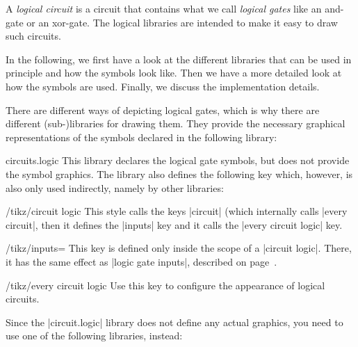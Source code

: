 A \emph{logical circuit} is a circuit that contains what we call
\emph{logical gates} like an and-gate or an xor-gate. The logical
libraries are intended to make it easy to draw such circuits.

In the following, we first have a look at the different libraries that
can be used in principle and how the symbols look like. Then we have a
more detailed look at how the symbols are used. Finally, we discuss
the implementation details.

There are different ways of depicting logical gates, which is why there
are different (sub-)libraries for drawing them. They provide the
necessary graphical representations of the symbols declared in the
following library: 

\begin{tikzlibrary}{circuits.logic}
  This library declares the logical gate symbols, but does not 
  provide the symbol graphics.
  The library also defines the following key which, however, is also
  only used indirectly, namely by other libraries:
  \begin{key}{/tikz/circuit logic}
    This style calls the keys |circuit| (which internally calls
    |every circuit|, then it defines the |inputs| key and it calls the
    |every circuit logic| key.
    \begin{key}{/tikz/inputs=}
      This key is defined only inside the scope of a
      |circuit logic|. There, it has the same effect as
      |logic gate inputs|, described on
      page~\pageref{logic-gates-inputs}. 
    \end{key}
    \begin{stylekey}{/tikz/every circuit logic}
      Use this key to configure the appearance of logical circuits.      
    \end{stylekey}
  \end{key}
\end{tikzlibrary}

Since the |circuit.logic| library does not define any actual graphics,
you need to use one of the following libraries, instead:

